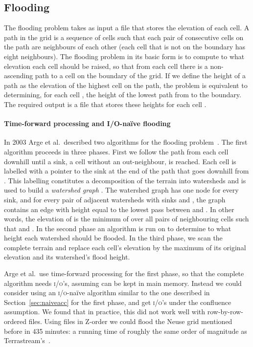 \documentclass[10pt,a4paper]{article}
\def\io{\textsc{i/o}\xspace}
\def\ios{\textsc{i/o}'s\xspace}
\begin{document}
\subsection{Flooding}
The flooding problem takes as input a file  that stores the elevation of each cell. A path in the grid is a sequence of cells such that each pair of consecutive cells on the path are neighbours of each other (each cell that is not on the boundary has eight neighbours). The flooding problem in its basic form is to compute to what elevation each cell should be raised, so that from each cell there is a non-ascending path to a cell on the boundary of the grid. If we define the height of a path as the elevation of the highest cell on the path, the problem is equivalent to determining, for each cell , the height of the lowest path from  to the boundary. The required output is a file  that stores these heights for each cell .

\paragraph{Time-forward processing and I/O-na\"ive flooding}
In 2003 Arge et al.\ described two algorithms for the flooding problem~\cite{terraflow}. The first algorithm proceeds in three phases.
First we follow the path from each cell downhill until a sink, a cell without an out-neighbour, is reached. Each cell  is labelled with a pointer  to the sink at the end of the path that goes downhill from . This labelling constitutes a decomposition of the terrain into watersheds and is used to build a \emph{watershed graph} . The watershed graph has one node for every sink, and for every pair of adjacent watersheds with sinks  and , the graph contains an edge  with height equal to the lowest pass between  and . In other words, the elevation of  is the minimum of  over all pairs of neighbouring cells  such that  and .
In the second phase an algorithm is run on  to determine to what height each watershed should be flooded. In the third phase, we scan the complete terrain and replace each cell's elevation by the maximum of its original elevation and its watershed's flood height.

Arge et al.\ use time-forward processing for the first phase, so that the complete algorithm needs  \ios, assuming  can be kept in main memory. Instead we could consider using an \io-na\"ive algorithm similar to the one described in Section~\ref{sec:naiveacc} for the first phase, and get  \ios under the confluence assumption. We found that in practice, this did not work well with row-by-row-ordered files. Using files in Z-order we could flood the Neuse grid mentioned before in 435 minutes: a running time of roughly the same order of magnitude as Terrastream's~\cite{terrastream}.
\end{document}
